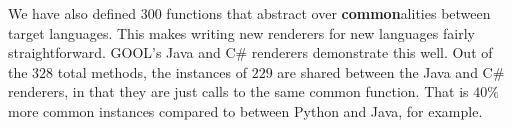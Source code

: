 \documentclass[sigplan,review,prologue,dvipsnames]{acmart}
\newcommand{\Csharp}{C\#}
\newcommand{\abbrev}[1]{\textbf{#1}}
\newcommand{\common}{\abbrev{common}}
\begin{document}
%
%

We have also defined $300$ functions that abstract over 
\common alities between target languages. This makes writing new renderers for 
new languages fairly straightforward. GOOL's Java and \Csharp{} renderers 
demonstrate this well. Out of the $328$ total methods,
the instances of $229$ are shared between the Java and \Csharp{} 
renderers, in that they are just calls to the same common function. That is 
$40\%$ more common instances compared to between Python and Java, for example.

\end{document}
